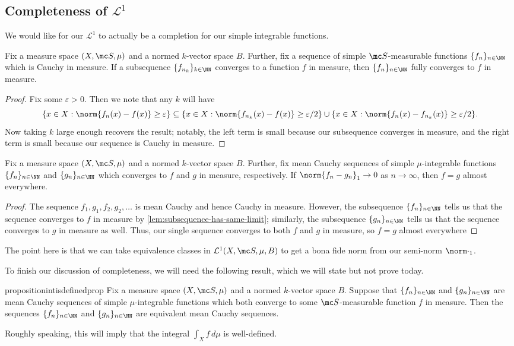 \documentclass[../notes.tex]{subfiles}
\begin{document}
\subsection{Completeness of \texorpdfstring{$\mathcal L^1$}{ L1}}
We would like for our $\mathcal L^1$ to actually be a completion for our simple integrable functions.
\begin{lemma} \label{lem:subsequence-has-same-limit}
	Fix a measure space $(X,\mc S,\mu)$ and a normed $k$-vector space $B$. Further, fix a sequence of simple $\mc S$-measurable functions $\{f_n\}_{n\in\NN}$ which is Cauchy in measure. If a subsequence $\{f_{n_k}\}_{k\in\NN}$ converges to a function $f$ in measure, then $\{f_n\}_{n\in\NN}$ fully converges to $f$ in measure.
\end{lemma}
\begin{proof}
	Fix some $\varepsilon>0$. Then we note that any $k$ will have
	\[\{x\in X:\norm{f_n(x)-f(x)}\ge\varepsilon\}\subseteq\{x\in X:\norm{f_{n_k}(x)-f(x)}\ge\varepsilon/2\}\cup\{x\in X:\norm{f_n(x)-f_{n_k}(x)}\ge\varepsilon/2\}.\]
	Now taking $k$ large enough recovers the result; notably, the left term is small because our subsequence converges in measure, and the right term is small because our sequence is Cauchy in measure.
\end{proof}
\begin{lemma}
	Fix a measure space $(X,\mc S,\mu)$ and a normed $k$-vector space $B$. Further, fix mean Cauchy sequences of simple $\mu$-integrable functions $\{f_n\}_{n\in\NN}$ and $\{g_n\}_{n\in\NN}$ which converges to $f$ and $g$ in measure, respectively. If $\norm{f_n-g_n}_1\to0$ as $n\to\infty$, then $f=g$ almost everywhere.
\end{lemma}
\begin{proof}
	The sequence $f_1,g_1,f_2,g_2,\ldots$ is mean Cauchy and hence Cauchy in measure. However, the subsequence $\{f_n\}_{n\in\NN}$ tells us that the sequence converges to $f$ in measure by \autoref{lem:subsequence-has-same-limit}; similarly, the subsequence $\{g_n\}_{n\in\NN}$ tells us that the sequence converges to $g$ in measure as well. Thus, our single sequence converges to both $f$ and $g$ in measure, so $f=g$ almost everywhere
\end{proof}
The point here is that we can take equivalence classes in $\mathcal L^1(X,\mc S,\mu,B)$ to get a bona fide norm from our semi-norm $\norm\cdot_1$.

To finish our discussion of completeness, we will need the following result, which we will state but not prove today.
\begin{restatable}{proposition}{intisdefinedprop}
	Fix a measure space $(X,\mc S,\mu)$ and a normed $k$-vector space $B$. Suppose that $\{f_n\}_{n\in\NN}$ and $\{g_n\}_{n\in\NN}$ are mean Cauchy sequences of simple $\mu$-integrable functions which both converge to some $\mc S$-measurable function $f$ in measure. Then the sequences $\{f_n\}_{n\in\NN}$ and $\{g_n\}_{n\in\NN}$ are equivalent mean Cauchy sequences.
\end{restatable}
\noindent Roughly speaking, this will imply that the integral $\int_Xf\,d\mu$ is well-defined.
\end{document}
